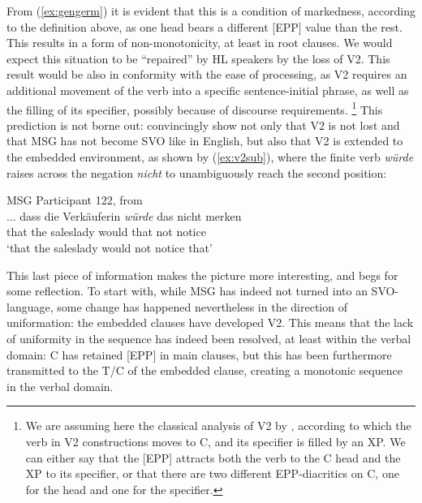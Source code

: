 \documentclass[output=paper]{langscibook}
\begin{document}
From (\ref{ex:gengerm}) it is evident that this is a condition of markedness, according to the definition above, as one head bears a different [EPP] value than the rest. This results in a form of non-monotonicity, at least in root clauses. We would expect this situation to be ``repaired'' by HL speakers by the loss of V2. This result would be also in conformity with the ease of processing, as V2 requires an additional movement of the verb into a specific sentence-initial phrase, as well as the filling of its specifier, possibly because of discourse requirements. \footnote{We are assuming here the classical analysis of V2 by \citet{denBesten77}, according to which the verb in V2 constructions moves to C, and its specifier is filled by an XP. We can either say that the [EPP] attracts both the verb to the C head and the XP to its specifier, or that there are two different EPP-diacritics on C, one for the head and one for the specifier.} This prediction is not borne out: \citet{HoppPutnam2015} convincingly show not only that V2 is not lost and that MSG has not become SVO like in English, but also that V2 is extended to the embedded environment, as shown by (\ref{ex:v2sub}), where the finite verb \textit{würde} raises across the negation \textit{nicht} to unambiguously reach the second position:

\begin{exe}
\ex MSG Participant 122, from \citealt[204]{HoppPutnam2015}\\
\gll ... dass die Verkäuferin \emph{würde} das nicht merken\\
{} that the saleslady would that not notice\\
\glt `that the saleslady would not notice that'\label{ex:v2sub}
\end{exe}
This last piece of information makes the picture more interesting, and begs for some reflection. To start with, while MSG has indeed not turned into an SVO-language, some change has happened nevertheless in the direction of uniformation: the embedded clauses have developed V2. This means that the lack of uniformity in the sequence has indeed been resolved, at least within the verbal domain: C has retained [EPP] in main clauses, but this has been furthermore transmitted to the T/C of the embedded clause, creating a monotonic sequence in the verbal domain.
\end{document}
